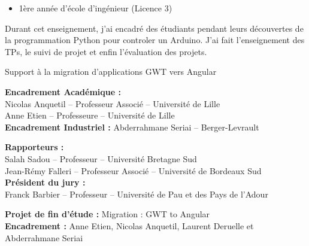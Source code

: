 \documentclass[10pt,a4paper,ragged2e,withhyper]{altacv}
\begin{document}
\divider


\begin{itemize}
  \item 1ère année d'école d'ingénieur (Licence 3)
\end{itemize}

Durant cet enseignement, j'ai encadré des étudiants pendant leurs découvertes de la programmation Python pour controler un Arduino.
J'ai fait l'enseignement des TPs, le suivi de projet et enfin l'évaluation des projets.

\medskip


Support à la migration d'applications GWT vers Angular

\textbf{Encadrement Académique :}\\
Nicolas Anquetil -- Professeur Associé -- Université de Lille\\
Anne Etien -- Professeure -- Université de Lille\\
\textbf{Encadrement Industriel :} Abderrahmane Seriai -- Berger-Levrault


\textbf{Rapporteurs :}\\
Salah Sadou -- Professeur -- Université Bretagne Sud\\
Jean-Rémy Falleri -- Professeur Associé -- Université de Bordeaux Sud\\

\textbf{Président du jury :}\\
Franck Barbier -- Professeur -- Université de Pau et des Pays de l’Adour


\divider

\pagebreak
{}

\textbf{Projet de fin d'étude :} Migration : GWT to Angular\\
\textbf{Encadrement :} Anne Etien, Nicolas Anquetil, Laurent Deruelle et Abderrahmane Seriai

\divider

\end{document}
